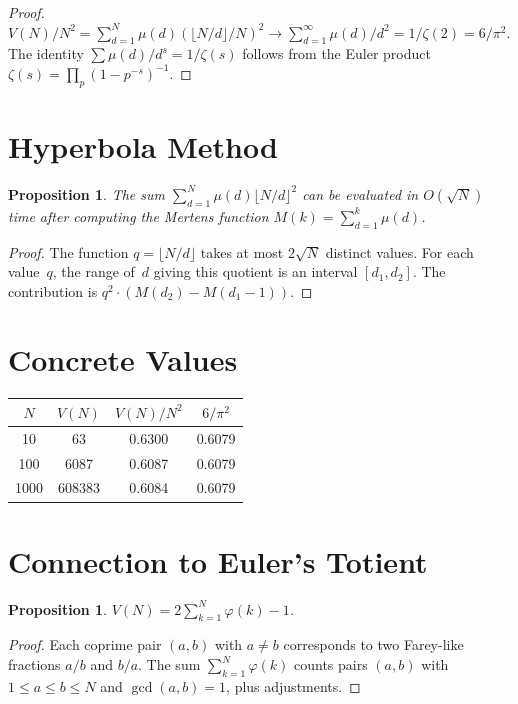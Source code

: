 \documentclass[11pt]{article}
\newtheorem{proposition}[theorem]{Proposition}
\begin{document}
\begin{proof}
$V(N)/N^2 = \sum_{d=1}^{N} \mu(d) (\lfloor N/d\rfloor / N)^2 \to \sum_{d=1}^{\infty} \mu(d)/d^2 = 1/\zeta(2) = 6/\pi^2$. The identity $\sum \mu(d)/d^s = 1/\zeta(s)$ follows from the Euler product $\zeta(s) = \prod_p (1-p^{-s})^{-1}$.
\end{proof}

\section{Hyperbola Method}

\begin{proposition}
The sum $\sum_{d=1}^{N} \mu(d)\lfloor N/d\rfloor^2$ can be evaluated in $O(\sqrt{N})$ time after computing the Mertens function $M(k) = \sum_{d=1}^{k} \mu(d)$.
\end{proposition}

\begin{proof}
The function $q = \lfloor N/d \rfloor$ takes at most $2\sqrt{N}$ distinct values. For each value~$q$, the range of~$d$ giving this quotient is an interval $[d_1, d_2]$. The contribution is $q^2 \cdot (M(d_2) - M(d_1 - 1))$.
\end{proof}

\section{Concrete Values}

\begin{center}
\begin{tabular}{cccc}
\toprule
$N$ & $V(N)$ & $V(N)/N^2$ & $6/\pi^2$ \\
\midrule
10   & 63       & 0.6300 & 0.6079 \\
100  & 6087     & 0.6087 & 0.6079 \\
1000 & 608383   & 0.6084 & 0.6079 \\
\bottomrule
\end{tabular}
\end{center}

\section{Connection to Euler's Totient}

\begin{proposition}
$V(N) = 2\sum_{k=1}^{N} \varphi(k) - 1$.
\end{proposition}

\begin{proof}
Each coprime pair $(a,b)$ with $a \ne b$ corresponds to two Farey-like fractions $a/b$ and $b/a$. The sum $\sum_{k=1}^{N}\varphi(k)$ counts pairs $(a,b)$ with $1 \le a \le b \le N$ and $\gcd(a,b) = 1$, plus adjustments.
\end{proof}
\end{document}
